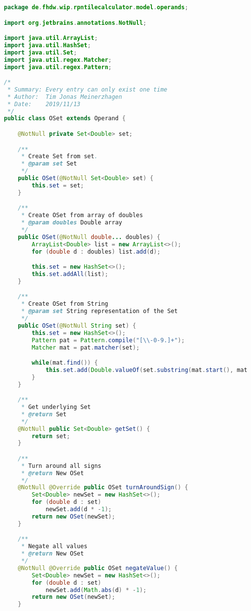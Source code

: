 \begin{lstlisting}[caption=OSet (Meinerzhagen),label=list:OSet,language=Java]
package de.fhdw.wip.rpntilecalculator.model.operands;

import org.jetbrains.annotations.NotNull;

import java.util.ArrayList;
import java.util.HashSet;
import java.util.Set;
import java.util.regex.Matcher;
import java.util.regex.Pattern;

/*
 * Summary: Every entry can only exist one time
 * Author:  Tim Jonas Meinerzhagen
 * Date:    2019/11/13
 */
public class OSet extends Operand {

    @NotNull private Set<Double> set;

    /**
     * Create Set from set.
     * @param set Set
     */
    public OSet(@NotNull Set<Double> set) {
        this.set = set;
    }

    /**
     * Create OSet from array of doubles
     * @param doubles Double array
     */
    public OSet(@NotNull double... doubles) {
        ArrayList<Double> list = new ArrayList<>();
        for (double d : doubles) list.add(d);

        this.set = new HashSet<>();
        this.set.addAll(list);
    }

    /**
     * Create OSet from String
     * @param set String representation of the Set
     */
    public OSet(@NotNull String set) {
        this.set = new HashSet<>();
        Pattern pat = Pattern.compile("[\\-0-9.]+");
        Matcher mat = pat.matcher(set);

        while(mat.find()) {
            this.set.add(Double.valueOf(set.substring(mat.start(), mat.end())));
        }
    }

    /**
     * Get underlying Set
     * @return Set
     */
    @NotNull public Set<Double> getSet() {
        return set;
    }

    /**
     * Turn around all signs
     * @return New OSet
     */
    @NotNull @Override public OSet turnAroundSign() {
        Set<Double> newSet = new HashSet<>();
        for (double d : set)
            newSet.add(d * -1);
        return new OSet(newSet);
    }

    /**
     * Negate all values
     * @return New OSet
     */
    @NotNull @Override public OSet negateValue() {
        Set<Double> newSet = new HashSet<>();
        for (double d : set)
            newSet.add(Math.abs(d) * -1);
        return new OSet(newSet);
    }


\end{lstlisting}
